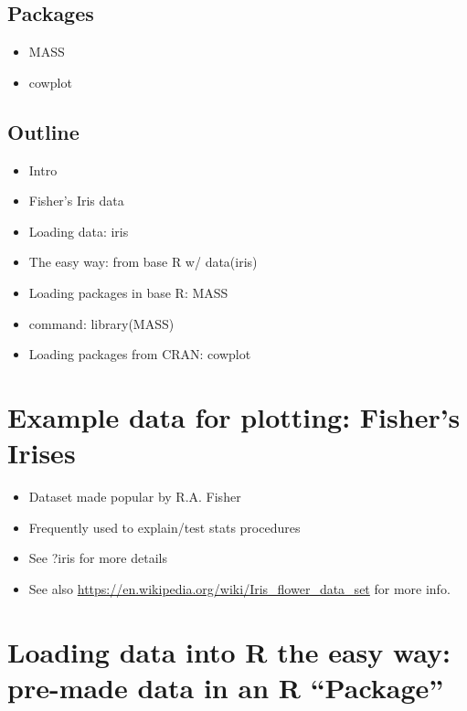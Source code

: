 \documentclass[]{book}
\providecommand{\tightlist}{%
  \setlength{\itemsep}{0pt}\setlength{\parskip}{0pt}}
\theoremstyle{definition}
\theoremstyle{definition}
\theoremstyle{definition}
\theoremstyle{remark}
\begin{document}
\subsection{Packages}\label{packages-4}

\begin{itemize}
\tightlist
\item
  MASS
\item
  cowplot
\end{itemize}

\subsection{Outline}\label{outline}

\begin{itemize}
\tightlist
\item
  Intro
\item
  Fisher's Iris data
\item
  Loading data: iris
\item
  The easy way: from base R w/ data(iris)
\item
  Loading packages in base R: MASS
\item
  command: library(MASS)
\item
  Loading packages from CRAN: cowplot
\end{itemize}

\section{Example data for plotting: Fisher's
Irises}\label{example-data-for-plotting-fishers-irises}

\begin{itemize}
\tightlist
\item
  Dataset made popular by R.A. Fisher
\item
  Frequently used to explain/test stats procedures
\item
  See ?iris for more details
\item
  See also \url{https://en.wikipedia.org/wiki/Iris_flower_data_set} for
  more info.
\end{itemize}

\section{\texorpdfstring{Loading data into R the easy way: pre-made data
in an R
``Package''}{Loading data into R the easy way: pre-made data in an R Package}}\label{loading-data-into-r-the-easy-way-pre-made-data-in-an-r-package}
\end{document}
